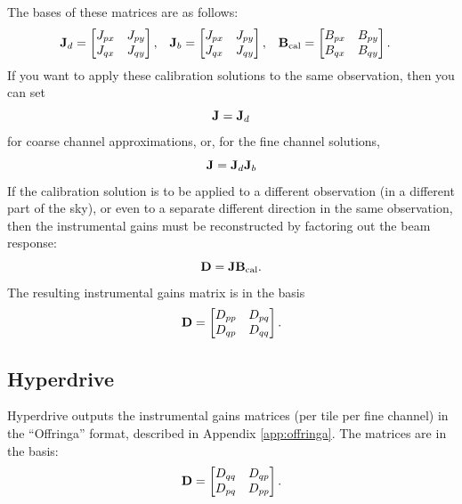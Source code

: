 \documentclass{book}
\begin{document}
The bases of these matrices are as follows:
\begin{align}
    {\bf J}_d &= \begin{bmatrix} J_{px} & J_{py} \\ J_{qx} & J_{qy} \end{bmatrix}, &
    {\bf J}_b &= \begin{bmatrix} J_{px} & J_{py} \\ J_{qx} & J_{qy} \end{bmatrix}, &
    {\bf B}_\text{cal} &= \begin{bmatrix} B_{px} & B_{py} \\ B_{qx} & B_{qy} \end{bmatrix}.
\end{align}
If you want to apply these calibration solutions to the same observation, then you can set
\begin{equation}
    {\bf J} = {\bf J}_d
\end{equation}
for coarse channel approximations, or, for the fine channel solutions,
\begin{equation}
    {\bf J} = {\bf J}_d {\bf J}_b
\end{equation}
If the calibration solution is to be applied to a different observation (in a different part of the sky), or even to a separate different direction in the same observation, then the instrumental gains must be reconstructed by factoring out the beam response:
\begin{equation}
    {\bf D} = {\bf J}{\bf B}_\text{cal}.
\end{equation}
The resulting instrumental gains matrix is in the basis
\begin{equation}
    {\bf D} = \begin{bmatrix} D_{pp} & D_{pq} \\ D_{qp} & D_{qq} \end{bmatrix}.
\end{equation}

\subsection{Hyperdrive}
\label{sec:hyperdrive}

Hyperdrive outputs the instrumental gains matrices (per tile per fine channel) in the ``Offringa'' format, described in Appendix \ref{app:offringa}.
The matrices are in the basis:
\begin{equation}
    {\bf D} = \begin{bmatrix}
        D_{qq} & D_{qp} \\
        D_{pq} & D_{pp}
    \end{bmatrix}.
\end{equation}
\end{document}
